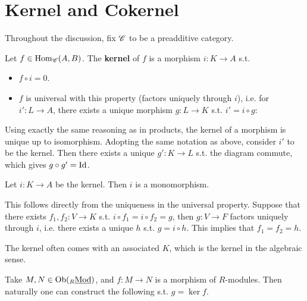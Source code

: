 \section{Kernel and Cokernel}

Throughout the discussion, fix $\mathscr{C}$ to be a preadditive category. 

\begin{definition}[Kernel]
    Let $f\in \mathrm{Hom}_{\mathscr{C}}(A, B)$. The \textbf{kernel} of $f$ is a morphism $i: K \to A$ s.t.
    \begin{itemize}
        \item $f \circ i = 0$.
        \item $f$ is universal with this property (factors uniquely through $i$), i.e. for $i': L \to A$, there exists a unique morphism $g: L \to K$ s.t. $i' = i \circ g$:
        \begin{figure}[htbp]
            \centering
        \end{figure}
    \end{itemize} 
\end{definition}

\begin{remark}
    Using exactly the same reasoning as in products, the kernel of a morphism is unique up to isomorphism. Adopting the same notation as above, consider $i'$ to be the kernel. Then there exists a unique $g': K \to L$ s.t. the diagram commute, which gives $g \circ g' = \mathrm{Id}$.
\end{remark}

\begin{remark}
    Let $i: K \to A$ be the kernel. Then $i$ is a monomorphism.

    This follows directly from the uniqueness in the universal property. Suppose that there exists $f_1, f_2: V \to K$ s.t. $i \circ f_1 = i \circ f_2 = g$, then $g: V \to F$ factors uniquely through $i$, i.e. there exists a unique $h$ s.t. $g = i \circ h$. This implies that $f_1 = f_2 = h$.
\end{remark}

\begin{example}
    The kernel often comes with an associated $K$, which is the kernel in the algebraic sense.

    Take $M, N \in \mathrm{Ob}({}_{R}\underline{\textup{Mod}})$, and $f: M \to N$ is a morphism of $R$-modules. Then naturally one can construct the following s.t. $g = \ker f$.
    \begin{figure}[htbp]
        \centering
    \end{figure}
\end{example}


